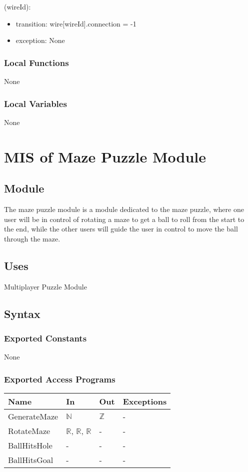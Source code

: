 \documentclass[12pt, titlepage]{article}
\begin{document}
(wireId):
\begin{itemize}
\item transition: wire[wireId].connection = -1
\item exception: None
\end{itemize}

\subsubsection{Local Functions}

None

\subsubsection{Local Variables}

None

\newpage

\section{MIS of Maze Puzzle Module} \label{MazeModule} 

\subsection{Module}

The maze puzzle module is a module dedicated to the maze puzzle, where one user will be in control of rotating a maze to get a ball to roll from the start to the end, while the other users will guide the user in control to move the ball through the maze. 

\subsection{Uses}
Multiplayer Puzzle Module
\subsection{Syntax}

\subsubsection{Exported Constants}
None
\subsubsection{Exported Access Programs}

\begin{center}
\begin{tabular}{p{3cm} p{4cm} p{4cm} p{2cm}}
\hline
\textbf{Name} & \textbf{In} & \textbf{Out} & \textbf{Exceptions} \\
\hline
GenerateMaze & $\mathbb{N}$ & $\mathbb{Z}$ & - \\
RotateMaze & $\mathbb{R}$, $\mathbb{R}$, $\mathbb{R}$ & - & - \\
BallHitsHole & - & - & - \\
BallHitsGoal & - & - & - \\
\hline
\end{tabular}
\end{center}
\end{document}
